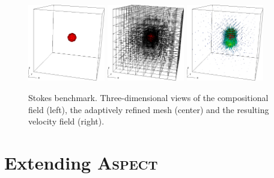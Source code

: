 \documentclass{article}
\newcommand{\aspect}{\textsc{Aspect}}
\begin{document}
\begin{figure}
  \begin{center}
    \includegraphics[width=0.3\textwidth]{cookbooks/benchmarks/stokes/composition}
    \hfill
    \includegraphics[width=0.3\textwidth]{cookbooks/benchmarks/stokes/mesh}
    \hfill
    \includegraphics[width=0.3\textwidth]{cookbooks/benchmarks/stokes/velocity}
  \end{center}
  \caption{Stokes benchmark. Three-dimensional views of the compositional field
  (left), the adaptively refined mesh (center) and the resulting velocity field
  (right).}
  \label{fig:stokes-falling-sphere-3d}
\end{figure}




\section{Extending \aspect}
\label{sec:extending}
\end{document}
